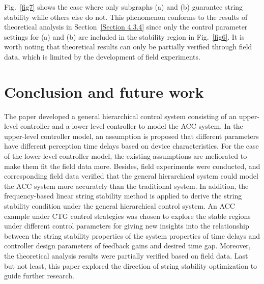 \documentclass[journal]{IEEEtran}
\begin{document}
Fig.~\ref{fig7} shows the case where only subgraphs (a) and (b) guarantee string stability while others else do not. This phenomenon conforms to the results of theoretical analysis in Section~\ref{Section 4.3.4} since only the control parameter settings for (a) and (b) are included in the stability region in Fig.~\ref{fig6}. It is worth noting that theoretical results can only be partially verified through field data, which is limited by the development of field experiments.


\section{Conclusion and future work}
\label{Section 5}

The paper developed a general hierarchical control system consisting of an upper-level controller and a lower-level controller to model the ACC system. In the upper-level controller model, an assumption is proposed that different parameters have different perception time delays based on device characteristics. For the case of the lower-level controller model, the existing assumptions are meliorated to make them fit the field data more. Besides, field experiments were conducted, and corresponding field data verified that the general hierarchical system could model the ACC system more accurately than the traditional system. In addition, the frequency-based linear string stability method is applied to derive the string stability condition under the general hierarchical control system. An ACC example under CTG control strategies was chosen to explore the stable regions under different control parameters for giving new insights into the relationship between the string stability properties of the system properties of time delays and controller design parameters of feedback gains and desired time gap. Moreover, the theoretical analysis results were partially verified based on field data. Last but not least, this paper explored the direction of string stability optimization to guide further research.
\end{document}
